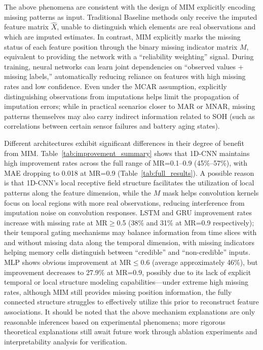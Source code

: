 \documentclass[5p,times]{elsarticle}
\begin{document}
The above phenomena are consistent with the design of MIM explicitly encoding missing patterns as input. Traditional Baseline methods only receive the imputed feature matrix $\hat{X}$, unable to distinguish which elements are real observations and which are imputed estimates. In contrast, MIM explicitly marks the missing status of each feature position through the binary missing indicator matrix $M$, equivalent to providing the network with a ``reliability weighting'' signal. During training, neural networks can learn joint dependencies on ``observed values + missing labels,'' automatically reducing reliance on features with high missing rates and low confidence. Even under the MCAR assumption, explicitly distinguishing observations from imputations helps limit the propagation of imputation errors; while in practical scenarios closer to MAR or MNAR, missing patterns themselves may also carry indirect information related to SOH (such as correlations between certain sensor failures and battery aging states).

Different architectures exhibit significant differences in their degree of benefit from MIM. Table~\ref{tab:improvement_summary} shows that 1D-CNN maintains high improvement rates across the full range of MR=0.1--0.9 (45\%--57\%), with MAE dropping to 0.018 at MR=0.9 (Table~\ref{tab:full_results}). A possible reason is that 1D-CNN's local receptive field structure facilitates the utilization of local patterns along the feature dimension, while the $M$ mask helps convolution kernels focus on local regions with more real observations, reducing interference from imputation noise on convolution responses. LSTM and GRU improvement rates increase with missing rate at MR$\geq$0.5 (38\% and 31\% at MR=0.9 respectively); their temporal gating mechanisms may balance information from time slices with and without missing data along the temporal dimension, with missing indicators helping memory cells distinguish between ``credible'' and ``non-credible'' inputs. MLP shows obvious improvement at MR$\leq$0.6 (average approximately 46\%), but improvement decreases to 27.9\% at MR=0.9, possibly due to its lack of explicit temporal or local structure modeling capabilities---under extreme high missing rates, although MIM still provides missing position information, the fully connected structure struggles to effectively utilize this prior to reconstruct feature associations. It should be noted that the above mechanism explanations are only reasonable inferences based on experimental phenomena; more rigorous theoretical explanations still await future work through ablation experiments and interpretability analysis for verification.
\end{document}
